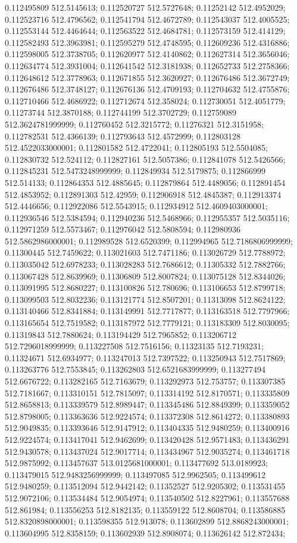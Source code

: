 0.112495809 512.5145613; 0.112520727 512.5727648; 0.11252142 512.4952029; 0.112523716 512.4796562; 0.112541794 512.4672789; 0.112543037 512.4005525; 0.112553144 512.4464644; 0.112563522 512.4684781; 0.112573159 512.414129; 0.112582493 512.3963981; 0.112595279 512.4748595; 0.112609236 512.4316886; 0.112598005 512.3738705; 0.112620977 512.4140862; 0.112627314 512.3656046; 0.112634774 512.3931004; 0.112641542 512.3181938; 0.112652733 512.2758366; 0.112648612 512.3778963; 0.112671855 512.3620927; 0.112676486 512.3672749; 0.112676486 512.3748127; 0.112676136 512.4709193; 0.112704632 512.4755876; 0.112710466 512.4686922; 0.112712674 512.358024; 0.112730051 512.4051779; 0.11273744 512.3870188; 0.112744199 512.3702729; 0.112759089 512.3624781999999; 0.112760452 512.3215772; 0.11276321 512.3151958; 0.112782531 512.4366139; 0.112793643 512.4572999; 0.112803128 512.4522033000001; 0.112801582 512.4722041; 0.112805193 512.5504085; 0.112830732 512.524112; 0.112827161 512.5057386; 0.112841078 512.5426566; 0.112845231 512.5473248999999; 0.112849934 512.5179875; 0.112866999 512.514133; 0.112864353 512.4885645; 0.112879864 512.4489056; 0.112891454 512.4853952; 0.112891303 512.42959; 0.112906918 512.4845387; 0.112913374 512.4446656; 0.112922086 512.5543915; 0.112934912 512.4609403000001; 0.112936546 512.5384594; 0.112940236 512.5468966; 0.112955357 512.5035116; 0.112971259 512.5573467; 0.112976042 512.5808594; 0.112980936 512.5862986000001; 0.112989528 512.6520399; 0.112994965 512.7186806999999; 0.11300445 512.7459622; 0.113021603 512.7471186; 0.113026729 512.7788972; 0.113035042 512.6978233; 0.113028283 512.7686612; 0.11305332 512.7882766; 0.113067428 512.8639969; 0.11306809 512.8007824; 0.113075128 512.8344026; 0.113091995 512.8680227; 0.113100826 512.780696; 0.113106653 512.8799718; 0.113099503 512.8032236; 0.113121774 512.8507201; 0.11313098 512.8624122; 0.113140466 512.8341884; 0.113149991 512.7717877; 0.113163518 512.7797966; 0.113165654 512.7519582; 0.113187972 512.7779121; 0.113183309 512.8030095; 0.11319843 512.7880624; 0.113194429 512.7965852; 0.113206712 512.7296018999999; 0.113227508 512.7516156; 0.11323135 512.7193231; 0.11324671 512.6934977; 0.113247013 512.7397522; 0.113250943 512.7517869; 0.113263776 512.7553845; 0.113262803 512.6521683999999; 0.113277494 512.6676722; 0.113282165 512.7163679; 0.113292973 512.753757; 0.113307385 512.7181667; 0.113310151 512.7815097; 0.113314192 512.8170571; 0.113335809 512.8658813; 0.113339579 512.8989447; 0.113345486 512.8849399; 0.113359052 512.8798005; 0.113363636 512.9224574; 0.113372308 512.8614272; 0.113380893 512.9049835; 0.113393646 512.9147912; 0.113404335 512.9480259; 0.113400916 512.9224574; 0.113417041 512.9462699; 0.113420428 512.9571483; 0.113436291 512.9430578; 0.113437024 512.9017714; 0.113434967 512.9035274; 0.113461718 512.9875992; 0.113457637 513.0125681000001; 0.113477692 513.0189923; 0.113479015 512.9483256999999; 0.113497085 512.9962505; 0.113499612 512.9480259; 0.113512094 512.9442142; 0.11352527 512.9205302; 0.113531455 512.9072106; 0.113534484 512.9054974; 0.113540502 512.8227961; 0.113557688 512.861984; 0.113556253 512.8182135; 0.113559122 512.8608704; 0.113586885 512.8320898000001; 0.113598355 512.913078; 0.113602899 512.8868243000001; 0.113604995 512.8358159; 0.113602939 512.8908074; 0.113626142 512.872434; 